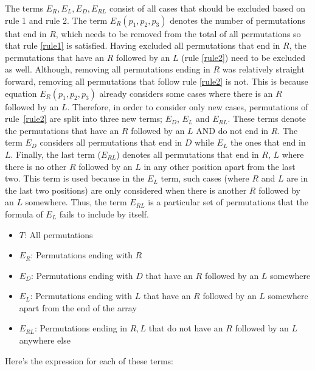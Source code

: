 The terms \(E_R, E_L, E_D, E_{RL}\) consist of all cases that should be excluded
based on rule 1 and rule 2.
The term \(E_R(p_1,p_2,p_3)\) denotes the number of permutations that end in
\(R\), which needs to be removed from the total of all permutations so that rule
\ref{rule1} is satisfied.
Having excluded all permutations that end in \(R\), the
permutations that have an \(R\) followed by an \(L\) (rule \ref{rule2}) need to
be excluded as well.
Although, removing all permutations ending in \(R\) was relatively straight
forward, removing all permutations that follow rule \ref{rule2} is not.
This is because equation \(E_R(p_1,p_2,p_3)\) already considers some cases where
there is an \(R\) followed by an \(L\).
Therefore, in order to consider only new cases, permutations of rule~\ref{rule2}
are split into three new terms; \(E_D\), \(E_L\) and \(E_{RL}\).
These terms denote the permutations that have an \(R\) followed by an \(L\) AND
do not end in \(R\).
The term \(E_D\) considers all permutations that end in \(D\) while \(E_L\) the
ones that end in \(L\).
Finally, the last term (\(E_{RL}\)) denotes all permutations that end in \(R\),
\(L\) where there is no other \(R\) followed by an \(L\) in any other position
apart from the last two.
This term is used because in the \(E_L\) term, such cases (where \(R\) and \(L\)
are in the last two positions) are only considered when there is another \(R\)
followed by an \(L\) somewhere.
Thus, the term \(E_{RL}\) is a particular set of permutations that the formula
of \(E_L\) fails to include by itself.

\begin{itemize}
    \item \(T\): All permutations
    \item \(E_R\): Permutations ending with \(R\)
    \item \(E_D\): Permutations ending with \(D\) that have an \(R\) followed by
    an \(L\) somewhere
    \item \(E_L\): Permutations ending with \(L\) that have an \(R\) followed by
    an \(L\) somewhere apart from the end of the array
    \item \(E_{RL}\): Permutations ending in \(R, L\) that do not have an \(R\)
    followed by an \(L\) anywhere else
\end{itemize}


Here's the expression for each of these terms:

